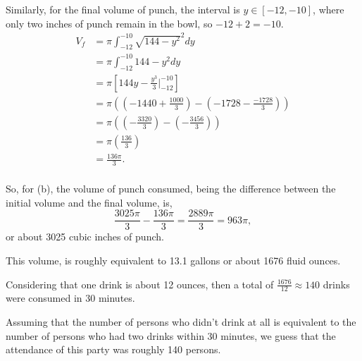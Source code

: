 \documentclass[../hw6.tex]{subfiles}
\begin{document}
Similarly, for the final volume of punch, the interval is $y\in[-12,-10]$, where only two inches of punch remain in the bowl, so $-12+2=-10$.
\begin{align*}
    V_f &= \pi \int_{-12}^{-10} {\sqrt{144-y^2}}^2 dy \\
    &= \pi \int_{-12}^{-10} 144-y^2 dy \\
    &= \pi \left[ 144y-\frac{y^3}{3} \bigg\vert_{-12}^{-10} \right] \\
    &= \pi \left( \left( -1440+\frac{1000}{3} \right) - \left( -1728-\frac{-1728}{3} \right)\right) \\
    &= \pi \left( \left( -\frac{3320}{3} \right) - \left( -\frac{3456}{3} \right) \right) \\
    &= \pi \left( \frac{136}{3} \right) \\
    &= \frac{136\pi}{3}. \\
\end{align*}

So, for (b), the volume of punch consumed, being the difference between the initial volume and the final volume, is,
\[\frac{3025\pi}{3} - \frac{136\pi}{3} = \frac{2889\pi}{3} = 963\pi,\]
or about 3025 cubic inches of punch.

This volume, is roughly equivalent to 13.1 gallons or about 1676 fluid ounces. 

Considering that one drink is about 12 ounces, then a total of $\frac{1676}{12}\approx140$ drinks were consumed in 30 minutes.

Assuming that the number of persons who didn't drink at all is equivalent to the number of persons who had two drinks within 30 minutes, we guess that the attendance of this party was roughly 140 persons.
\end{document}
